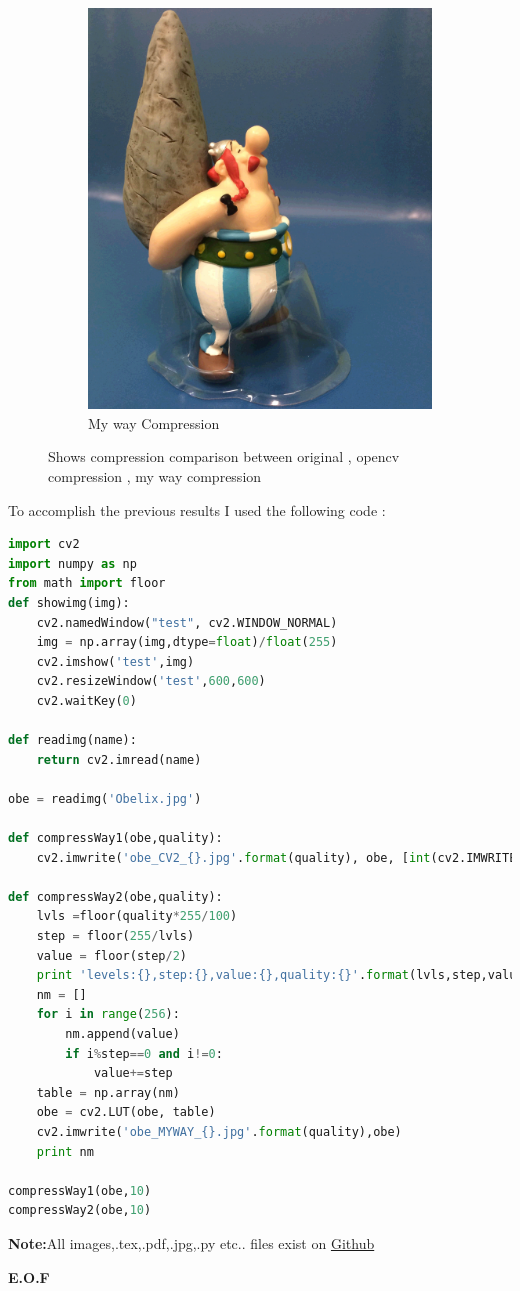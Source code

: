\documentclass{article}
\begin{document}
\begin{figure}[H]
\begin{subfigure}{.5\textwidth}
\vspace{5mm}
  \centering
\includegraphics[scale=0.1]{obe_MYWAY_10.jpg}
  \caption{My way Compression}
  \label{fig:sfig1}
  \hspace{5mm}
\end{subfigure}
\caption{Shows compression comparison between original , opencv compression , my way compression}
\end{figure}

To accomplish the previous results I used the following code :
\begin{lstlisting}[language=Python]
import cv2
import numpy as np
from math import floor
def showimg(img):
    cv2.namedWindow("test", cv2.WINDOW_NORMAL)
    img = np.array(img,dtype=float)/float(255)
    cv2.imshow('test',img)
    cv2.resizeWindow('test',600,600)
    cv2.waitKey(0)

def readimg(name):
    return cv2.imread(name)

obe = readimg('Obelix.jpg')

def compressWay1(obe,quality):
    cv2.imwrite('obe_CV2_{}.jpg'.format(quality), obe, [int(cv2.IMWRITE_JPEG_QUALITY), quality])

def compressWay2(obe,quality):
    lvls =floor(quality*255/100)
    step = floor(255/lvls)
    value = floor(step/2)
    print 'levels:{},step:{},value:{},quality:{}'.format(lvls,step,value,quality)
    nm = []
    for i in range(256):
        nm.append(value)
        if i%step==0 and i!=0:
            value+=step
    table = np.array(nm)
    obe = cv2.LUT(obe, table)
    cv2.imwrite('obe_MYWAY_{}.jpg'.format(quality),obe)
    print nm

compressWay1(obe,10)
compressWay2(obe,10)
\end{lstlisting}

\textbf{Note:}All images,.tex,.pdf,.jpg,.py etc.. files exist on \href{https://github.com/aqeel13932/IP/tree/master/hw7}{Github}
\begin{center}
\textbf{E.O.F}
\end{center}
\end{document}
